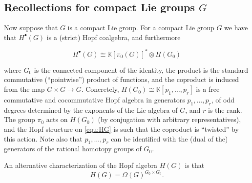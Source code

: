 \documentclass[a4paper]{amsart}
\theoremstyle{plain}
\theoremstyle{definition}
\newcommand{\K}{{\mathbb{K}}}
\newcommand{\beq}[1]{
\begin{equation}\label{#1}
}
\newcommand{\eeq}{
\end{equation}
}
\begin{document}

\subsection{Recollections for compact Lie groups \texorpdfstring{$G$}{G}}\label{sec:compactGrecollection}
Now suppose that $G$ is a compact Lie group. 
For a compact Lie group $G$ we have that $H^\bullet(G)$ is a (strict) Hopf coalgebra, and furthermore
\beq{equ:HG}
 H^\bullet(G)\cong \K[\pi_0(G)]^* \otimes H(G_0)
\eeq
where $G_0$ is the connected component of the identity, the product is the standard commutative (``pointwise'') product of functions, and the coproduct is induced from the map $G\times G\to G$.
Concretely, $H(G_0)\cong \K[p_1,\dots, p_r]$ is a free commutative and cocommutative Hopf algebra in generators $p_1,\dots,p_r$, of odd degrees determined by the exponents of the Lie algebra of $G$, and $r$ is the rank. 
The group $\pi_0$ acts on $H(G_0)$ (by conjugation with arbitrary representatives), and the Hopf structure on \eqref{equ:HG} is such that the coproduct is ``twisted'' by this action.
Note also that $p_1,\dots, p_r$ can be identified with the (dual of the) generators of the rational homotopy groups of $G_0$.

An alternative characterization of the Hopf algebra $H(G)$ is that 
\[
 H(G) = \Omega(G)^{G_0\times G_0}.
\]

% 
\end{document}
